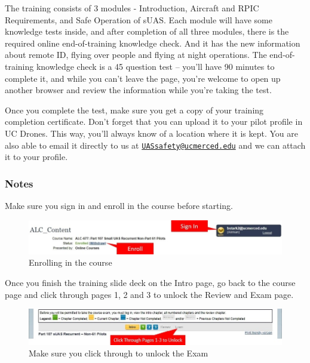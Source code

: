 \documentclass[
  12pt,
]{book}
\begin{document}
The training consists of 3 modules - Introduction, Aircraft and RPIC Requirements, and Safe Operation of sUAS. Each module will have some knowledge tests inside, and after completion of all three modules, there is the required online end-of-training knowledge check. And it has the new information about remote ID, flying over people and flying at night operations. The end-of-training knowledge check is a 45 question test -- you'll have 90 minutes to complete it, and while you can't leave the page, you're welcome to open up another browser and review the information while you're taking the test.

Once you complete the test, make sure you get a copy of your training completion certificate. Don't forget that you can upload it to your pilot profile in UC Drones. This way, you'll always know of a location where it is kept. You are also able to email it directly to us at \href{mailto:UASsafety@ucmerced.edu}{\nolinkurl{UASsafety@ucmerced.edu}} and we can attach it to your profile.

\hypertarget{notes}{%
\subsubsection{Notes}\label{notes}}

Make sure you sign in and enroll in the course before starting.

\begin{figure}
\includegraphics[width=1\linewidth]{images/P107R-enroll} \caption{Enrolling in the course}\label{fig:p107-enroll}
\end{figure}

Once you finish the training slide deck on the Intro page, go back to the course page and click through pages 1, 2 and 3 to unlock the Review and Exam page.

\begin{figure}
\includegraphics[width=1\linewidth]{images/P107R-unlock} \caption{Make sure you click through to unlock the Exam}\label{fig:p107-unlock}
\end{figure}
\end{document}
